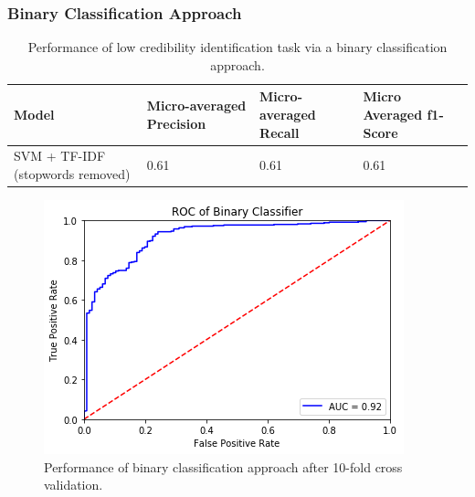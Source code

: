 \documentclass[a4paper,twoside,phd]{BYUPhys}
\begin{document}
\subsubsection{Binary Classification Approach}
\label{sec:BinaryApproachResults}

\begin{table}[H]
	\centering
		\begin{tabular}{|p{2cm}|p{3.5cm}|p{3.5cm}|p{3.5cm}|}
			\hline
			
			\textbf{Model} & \textbf{Micro-averaged Precision} & \textbf{Micro-averaged Recall} & \textbf{Micro Averaged \newline f1-Score}                                                                                                                                                                                                                                                                                                                                    \\
			\hline                                                                                                                                              
			SVM + \newline TF-IDF \newline (stopwords removed) & 0.61 & 0.61 & 0.61 \\
			\hline
			
			
			
	\end{tabular}
	\caption{Performance of low credibility identification task via a binary classification approach.}
	\label{table:BinaryApproach}
\end{table}

\begin{figure}[H]
	\centering
	\includegraphics[totalheight=6cm]{images/binary-roc-curve.png}
	\caption{Performance of binary classification approach after 10-fold cross validation.}
	\label{fig:BinaryPerformance}
\end{figure}
\end{document}
